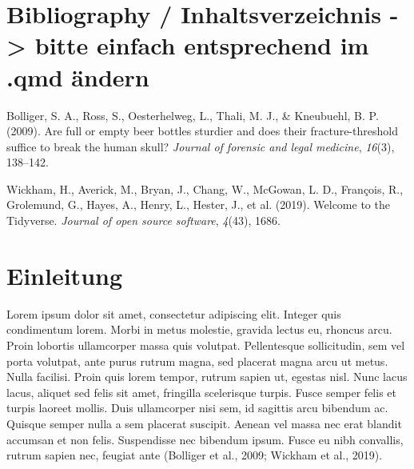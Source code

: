 \documentclass[
  12pt,
  a4paperpaper,
  a4paper]{scrreprt}
\newlength{\cslhangindent}
\newenvironment{CSLReferences}[2] %
 {\begin{list}{}{%
  \setlength{\itemindent}{0pt}
  \setlength{\leftmargin}{0pt}
  \setlength{\parsep}{0pt}
  \ifodd #1
   \setlength{\leftmargin}{\cslhangindent}
   \setlength{\itemindent}{-1\cslhangindent}
  \fi
  \setlength{\itemsep}{#2\baselineskip}}}
 {\end{list}}
\begin{document}
\clearpage


\chapter*{Bibliography / Inhaltsverzeichnis -\textgreater{} bitte
einfach entsprechend im .qmd
ändern}\label{bibliography-inhaltsverzeichnis---bitte-einfach-entsprechend-im-.qmd-uxe4ndern}


\label{refs}
\begin{CSLReferences}{1}{0}
Bolliger, S. A., Ross, S., Oesterhelweg, L., Thali, M. J., \& Kneubuehl,
B. P. (2009). Are full or empty beer bottles sturdier and does their
fracture-threshold suffice to break the human skull? \emph{Journal of
forensic and legal medicine}, \emph{16}(3), 138--142.

Wickham, H., Averick, M., Bryan, J., Chang, W., McGowan, L. D.,
François, R., Grolemund, G., Hayes, A., Henry, L., Hester, J., et al.
(2019). Welcome to the Tidyverse. \emph{Journal of open source
software}, \emph{4}(43), 1686.

\end{CSLReferences}

\cleardoublepage
{}
{}
\appendix

\chapter{Einleitung}\label{einleitung-1}

Lorem ipsum dolor sit amet, consectetur adipiscing elit. Integer quis
condimentum lorem. Morbi in metus molestie, gravida lectus eu, rhoncus
arcu. Proin lobortis ullamcorper massa quis volutpat. Pellentesque
sollicitudin, sem vel porta volutpat, ante purus rutrum magna, sed
placerat magna arcu ut metus. Nulla facilisi. Proin quis lorem tempor,
rutrum sapien ut, egestas nisl. Nunc lacus lacus, aliquet sed felis sit
amet, fringilla scelerisque turpis. Fusce semper felis et turpis laoreet
mollis. Duis ullamcorper nisi sem, id sagittis arcu bibendum ac. Quisque
semper nulla a sem placerat suscipit. Aenean vel massa nec erat blandit
accumsan et non felis. Suspendisse nec bibendum ipsum. Fusce eu nibh
convallis, rutrum sapien nec, feugiat ante (Bolliger et al., 2009;
Wickham et al., 2019).
\end{document}
